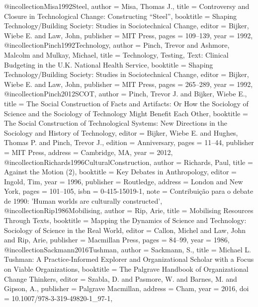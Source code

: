 @incollection{Misa1992Steel,
  author    = {Misa, Thomas J.},
  title     = {{Controversy and Closure in Technological Change: Constructing ``Steel''}},
  booktitle = {{Shaping Technology/Building Society: Studies in Sociotechnical Change}},
  editor    = {Bijker, Wiebe E. and Law, John},
  publisher = {MIT Press},
  pages     = {109--139},
  year      = {1992},
}
@incollection{Pinch1992Technology,
  author    = {Pinch, Trevor and Ashmore, Malcolm and Mulkay, Michael},
  title     = {{Technology, Testing, Text: Clinical Budgeting in the U.K. National Health Service}},
  booktitle = {{Shaping Technology/Building Society: Studies in Sociotechnical Change}},
  editor    = {Bijker, Wiebe E. and Law, John},
  publisher = {MIT Press},
  pages     = {265--289},
  year      = {1992},
}
@incollection{Pinch2012SCOT,
  author    = {Pinch, Trevor J. and Bijker, Wiebe E.},
  title     = {{The Social Construction of Facts and Artifacts: Or How the Sociology of Science and the Sociology of Technology Might Benefit Each Other}},
  booktitle = {{The Social Construction of Technological Systems: New Directions in the Sociology and History of Technology}},
  editor    = {Bijker, Wiebe E. and Hughes, Thomas P. and Pinch, Trevor J.},
  edition   = {Anniversary},
  pages     = {11--44},
  publisher = {MIT Press},
  address   = {Cambridge, MA},
  year      = {2012},
}
@incollection{Richards1996CulturalConstruction,
  author    = {Richards, Paul},
  title     = {{Against the Motion (2)}},
  booktitle = {{Key Debates in Anthropology}},
  editor    = {Ingold, Tim},
  year      = {1996},
  publisher = {Routledge},
  address   = {London and New York},
  pages     = {101--105},
  isbn      = {0-415-15019-1},
  note      = {Contribuição para o debate de 1990: 'Human worlds are culturally constructed'},
}
@incollection{Rip1986Mobilising,
  author    = {Rip, Arie},
  title     = {{Mobilising Resources Through Texts}},
  booktitle = {{Mapping the Dynamics of Science and Technology: Sociology of Science in the Real World}},
  editor    = {Callon, Michel and Law, John and Rip, Arie},
  publisher = {Macmillan Press},
  pages     = {84--99},
  year      = {1986},
}
@incollection{Sackmann2016Tushman,
  author    = {Sackmann, S.},
  title     = {{Michael L. Tushman: A Practice-Informed Explorer and Organizational Scholar with a Focus on Viable Organizations}},
  booktitle = {{The Palgrave Handbook of Organizational Change Thinkers}},
  editor    = {Szabla, D. and Pasmore, W. and Barnes, M. and Gipson, A.},
  publisher = {Palgrave Macmillan},
  address   = {Cham},
  year      = {2016},
  doi       = {10.1007/978-3-319-49820-1_97-1},
}
